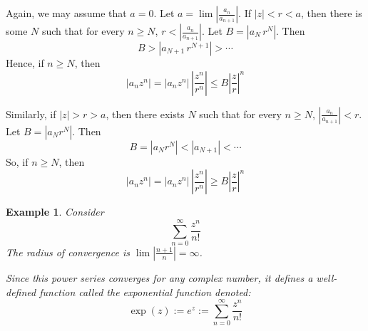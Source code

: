 \documentclass[twoside]{report}
\newcounter{Lecture}
\theoremstyle{myts}
\newcounter{c}[Lecture]
\newtheorem*{epl}{Example}
\newcounter{ex}[Lecture]
\newenvironment{prf}{
  \noindent\begin{mdframed}[style=prf]}{\end{mdframed} \vspace{1em}
}
\begin{document}
\begin{prf}
  Again, we may assume that \(a=0\). Let \( a = \lim \left| \frac{a_n}{a_{n+1}} \right| \). If \( |z| < r < a \), then there is some \(N\) such that for every \( n\geq N\), \( r < \left| \frac{a_n}{a_{n+1}} \right| \). Let \( B = \left| a_N \, r^N \right| \). Then
  \[
    B > \left| a_{N+1} \, r^{N+1} \right| > \cdots
  \]
  Hence, if \(n\geq N\), then 
  \[
    \left| a_n z^n \right| = \left| a_n z^n \right| \, \left| \frac{z^n}{r^n} \right| \leq B \left| \frac{z}{r} \right|^n
  \]
  
  \noindent
  Similarly, if \( |z| > r > a \), then there exists $N$ such that for every \( n\geq N \), \( \left| \frac{a_n}{a_{n+1}} \right| < r \). Let \(B = \left| a_N r^N \right| \). Then
  \[
    B = \left| a_N r^N \right| < \left| a_{N+1} \right| < \cdots
  \]
  So, if \(n\geq N\), then 
  \[
    \left| a_n z^n \right| = \left| a_n z^n \right| \, \left| \frac{z^n}{r^n} \right| \geq B \left| \frac{z}{r} \right|^n
  \]
\end{prf}

\begin{epl}
  Consider
  \[
    \sum_{n=0}^{\infty} \frac{z^n}{n!}
  \]
  The radius of convergence is \(\lim \left| \frac{n+1}{n} \right| = \infty \).

  \noindent
  Since this power series converges for any complex number, it defines a well-defined function called the \emph{exponential function} denoted:
  \[
    \exp (z) := e^z := \sum_{n=0}^{\infty} \frac{z^n}{n!}
  \]
\end{epl}
\end{document}
